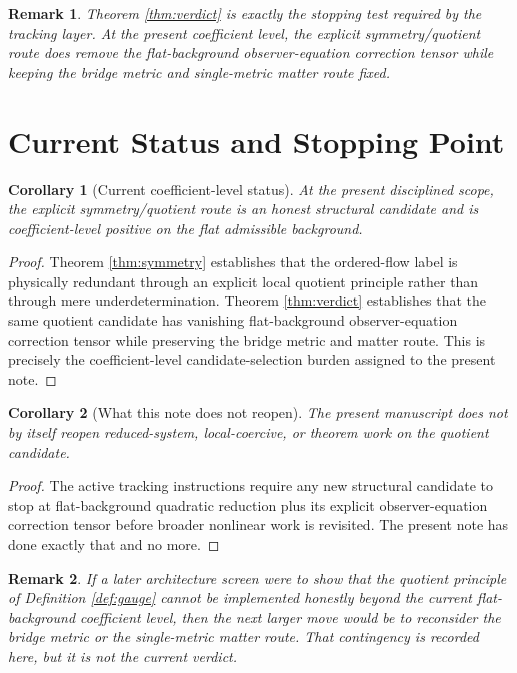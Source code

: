 \documentclass[11pt]{article}
\newtheorem{remark}{Remark}
\newtheorem{corollary}{Corollary}
\begin{document}
\begin{remark}
Theorem \ref{thm:verdict} is exactly the stopping test required by the tracking layer. At the present coefficient level, the explicit symmetry/quotient route does remove the flat-background observer-equation correction tensor while keeping the bridge metric and single-metric matter route fixed.
\end{remark}

\section{Current Status and Stopping Point}

\begin{corollary}[Current coefficient-level status]
\label{cor:status}
At the present disciplined scope, the explicit symmetry/quotient route is an honest structural candidate and is coefficient-level positive on the flat admissible background.
\end{corollary}

\begin{proof}
Theorem \ref{thm:symmetry} establishes that the ordered-flow label is physically redundant through an explicit local quotient principle rather than through mere underdetermination. Theorem \ref{thm:verdict} establishes that the same quotient candidate has vanishing flat-background observer-equation correction tensor while preserving the bridge metric and matter route. This is precisely the coefficient-level candidate-selection burden assigned to the present note.
\end{proof}

\begin{corollary}[What this note does not reopen]
\label{cor:stop}
The present manuscript does not by itself reopen reduced-system, local-coercive, or theorem work on the quotient candidate.
\end{corollary}

\begin{proof}
The active tracking instructions require any new structural candidate to stop at flat-background quadratic reduction plus its explicit observer-equation correction tensor before broader nonlinear work is revisited. The present note has done exactly that and no more.
\end{proof}

\begin{remark}
If a later architecture screen were to show that the quotient principle of Definition \ref{def:gauge} cannot be implemented honestly beyond the current flat-background coefficient level, then the next larger move would be to reconsider the bridge metric or the single-metric matter route. That contingency is recorded here, but it is not the current verdict.
\end{remark}
\end{document}
